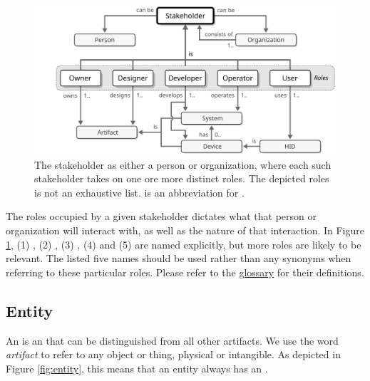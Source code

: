 \vspace*{0.3cm}

\begin{figure}[ht!]
  \centering
  \includegraphics[scale=0.9]{figures/stakeholder}
  \caption{
    The stakeholder as either a person or organization, where each such stakeholder takes on one ore more distinct roles.
    The depicted roles is not an exhaustive list.
     is an abbreviation for .
  }
  \label{fig:stakeholder}
\end{figure}

\vspace*{0.1cm}

The roles occupied by a given stakeholder dictates what  that person or organization will interact with, as well as the nature of that interaction.
In Figure \ref{fig:stakeholder}, (1) , (2) , (3) , (4)  and (5)  are named explicitly, but more roles are likely to be relevant.
The listed five names should be used rather than any synonyms when referring to these particular roles.
Please refer to the \hyperref[sec:glossary]{glossary} for their definitions.

\subsection{Entity}
\label{sec:reference-model:entity}

An  is an  that can be distinguished from all other artifacts.
We use the word \textit{artifact} to refer to any object or thing, physical or intangible.
As depicted in Figure \ref{fig:entity}, this means that an entity always has an .

